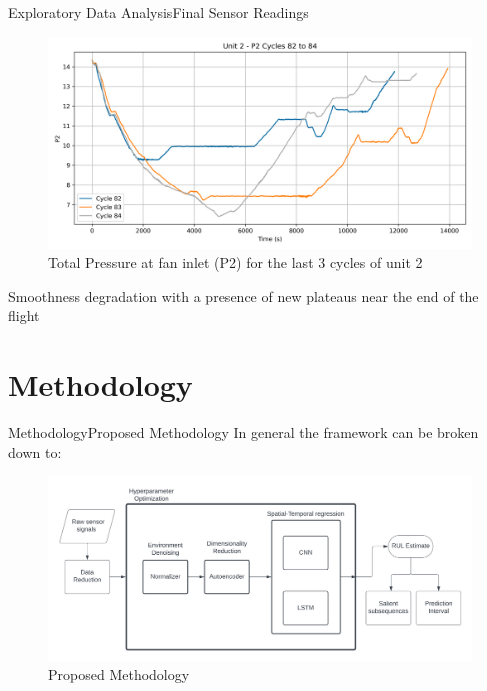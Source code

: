 \documentclass{beamer}
\begin{document}
        \begin{frame}{Exploratory Data Analysis}{Final Sensor Readings}
            \begin{figure}[!htbp]
                \centering
                \includegraphics[scale=0.35]{unit_2_P2_cycles_82_84.png}
                \caption{Total Pressure at fan inlet (P2) for the last 3 cycles of unit 2}
            \end{figure}
            Smoothness degradation with a presence of new plateaus near the end of the flight
        \end{frame}

    \section{Methodology}

        \begin{frame}{Methodology}{Proposed Methodology}
            In general the framework can be broken down to:
            \begin{figure}[!htbp]
                \centering
                \includegraphics[scale=0.45]{pdm-ml-process.png}
                \caption{Proposed Methodology}
            \end{figure}
        \end{frame}
\end{document}
